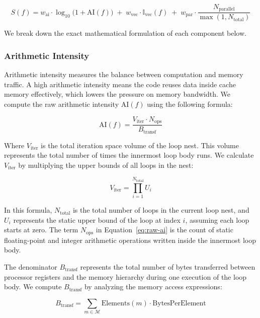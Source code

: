 \begin{equation}
    S(f) = w_\text{ai} \cdot \log_{10}\!\bigl(1 + \text{AI}(f)\bigr) \;+\; w_\text{vec} \cdot \mathbb{I}_\text{vec}(f) \;+\; w_\text{par} \cdot \frac{N_\text{parallel}}{\max(1, N_\text{total})}
    \label{eq:efficiency-score}
\end{equation}

We break down the exact mathematical formulation of each component below.

\subsubsection{Arithmetic Intensity}
Arithmetic intensity measures the balance between computation and memory traffic. A high arithmetic intensity means the code reuses data inside cache memory effectively, which lowers the pressure on memory bandwidth. We compute the raw arithmetic intensity $\text{AI}(f)$ using the following formula:

\begin{equation}
    \text{AI}(f) = \frac{V_{\text{iter}} \cdot N_{\text{ops}}}{B_{\text{transf}}}
    \label{eq:raw-ai}
\end{equation}

Where $V_{\text{iter}}$ is the total iteration space volume of the loop nest. This volume represents the total number of times the innermost loop body runs. We calculate $V_{\text{iter}}$ by multiplying the upper bounds of all loops in the nest:

\begin{equation}
    V_{\text{iter}} = \prod_{i=1}^{N_{\text{total}}} U_i
    \label{eq:iter-volume}
\end{equation}

In this formula, $N_{\text{total}}$ is the total number of loops in the current loop nest, and $U_i$ represents the static upper bound of the loop at index $i$, assuming each loop starts at zero. The term $N_{\text{ops}}$ in Equation~\ref{eq:raw-ai} is the count of static floating-point and integer arithmetic operations written inside the innermost loop body. 

The denominator $B_{\text{transf}}$ represents the total number of bytes transferred between processor registers and the memory hierarchy during one execution of the loop body. We compute $B_{\text{transf}}$ by analyzing the memory access expressions:

\begin{equation}
    B_{\text{transf}} = \sum_{m \in \mathcal{M}} \text{Elements}(m) \cdot \text{BytesPerElement}
    \label{eq:bytes-transferred}
\end{equation}

